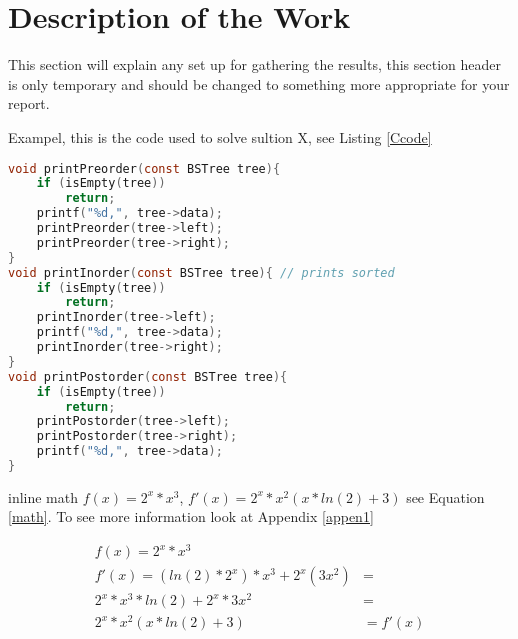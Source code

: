 \section{Description of the Work}


This section will explain any set up for gathering the results, this section header is only temporary and should be changed to something more appropriate for your report.

Exampel, this is the code used to solve sultion X, see Listing \ref{Ccode}

\begin{lstlisting}[language=c,caption=some code,label=Ccode]
void printPreorder(const BSTree tree){
	if (isEmpty(tree))
		return;
	printf("%d,", tree->data);
	printPreorder(tree->left);
	printPreorder(tree->right);
}
void printInorder(const BSTree tree){ // prints sorted
	if (isEmpty(tree)) 
		return;
	printInorder(tree->left);
	printf("%d,", tree->data);
	printInorder(tree->right);
}
void printPostorder(const BSTree tree){
	if (isEmpty(tree)) 
		return;
	printPostorder(tree->left);
	printPostorder(tree->right);
	printf("%d,", tree->data);
}
\end{lstlisting}

inline math $f(x) = 2^x * x^3$,  $f'(x)=2^x*x^2(x*ln(2)+3)$ see Equation \ref{math}. To see more information look at Appendix \ref{appen1}

\begin{equation}
    \begin{aligned}
        f(x) = 2^x * x^3 & \\[5pt]
        f'(x) = (ln(2)*2^x)*x^3+2^x(3x^2) &= \\[5pt]
        2^x*x^3*ln(2)+2^x*3x^2 &= \\[5pt]
        2^x*x^2(x*ln(2)+3) &= f'(x)
    \end{aligned}
    \label{math}
\end{equation}

